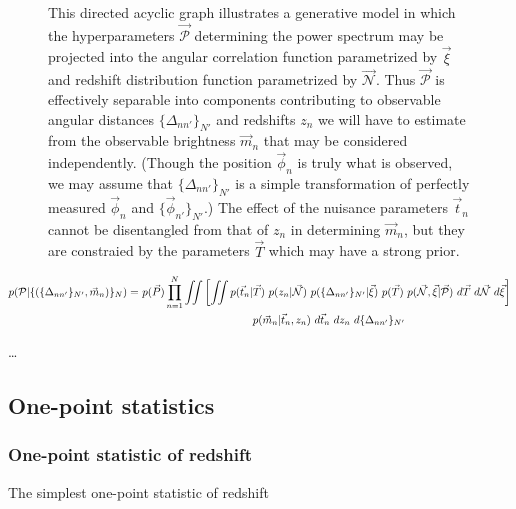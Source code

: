 \documentclass[12pt, onecolumn]{emulateapj}
\begin{document}
\begin{figure}
\begin{center}
\begin{tikzpicture}[node distance=1cm]
\end{tikzpicture}
\caption{This directed acyclic graph illustrates a generative model in which the hyperparameters $\vec{\mathcal{P}}$ determining the power spectrum may be projected into the angular correlation function parametrized by $\vec{\xi}$ and redshift distribution function parametrized by $\vec{\mathcal{N}}$.  Thus $\vec{\mathcal{P}}$ is effectively separable into components contributing to observable angular distances $\{\Delta_{nn'}\}_{N'}$ and redshifts $z_{n}$ we will have to estimate from the observable brightness $\vec{m}_{n}$ that may be considered independently.  (Though the position $\vec{\phi}_{n}$ is truly what is observed, we may assume that $\{\Delta_{nn'}\}_{N'}$ is a simple transformation of perfectly measured $\vec{\phi}_{n}$ and $\{\vec{\phi}_{n'}\}_{N'}$.)  The effect of the nuisance parameters $\vec{t}_{n}$ cannot be disentangled from that of $z_{n}$ in determining $\vec{m}_{n}$, but they are constraied by the parameters $\vec{T}$ which may have a strong prior.}
\end{center}
\end{figure}

\begin{align}
\label{eq:fullcc}
p(\mathcal{P}|\{(\{\Delta_{nn'}\}_{N'},\vec{m}_{n})\}_{N}) =& \ p(\vec{P})\prod_{n=1}^{N}\iint\left[\iint p(\vec{t}_{n}|\vec{T})\ p(z_{n}|\vec{\mathcal{N}})\ p(\{\Delta_{nn'}\}_{N'}|\vec{\xi})\ p(\vec{T})\ p(\vec{\mathcal{N}},\vec{\xi}|\vec{\mathcal{P}})\ d\vec{T}\ d\vec{\mathcal{N}}\ d\vec{\xi}\right]\\
& %
\indent\indent\indent\indent\indent\indent\indent p(\vec{m}_{n}|\vec{t}_{n},z_{n})\ d\vec{t}_{n}\ dz_{n}\ d\{\Delta_{nn'}\}_{N'}
\end{align}

\dots

\subsection{One-point statistics}

\subsubsection{One-point statistic of redshift}

The simplest one-point statistic of redshift 
\end{document}
